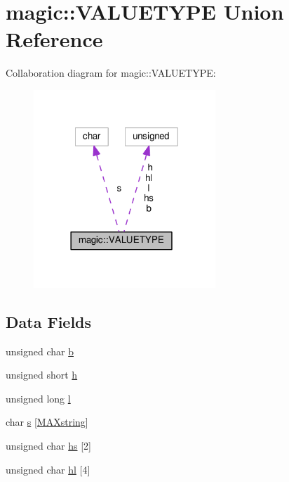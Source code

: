 \hypertarget{unionmagic_1_1VALUETYPE}{}\section{magic\+:\+:V\+A\+L\+U\+E\+T\+Y\+PE Union Reference}
\label{unionmagic_1_1VALUETYPE}


Collaboration diagram for magic\+:\+:V\+A\+L\+U\+E\+T\+Y\+PE\+:
\nopagebreak
\begin{figure}[H]
\begin{center}
\leavevmode
\includegraphics[width=194pt]{unionmagic_1_1VALUETYPE__coll__graph}
\end{center}
\end{figure}
\subsection*{Data Fields}
\begin{DoxyCompactItemize}
\item 
unsigned char \hyperlink{unionmagic_1_1VALUETYPE_a4378c4cc522bc5df8b7867a8d813cc6b}{b}
\item 
unsigned short \hyperlink{unionmagic_1_1VALUETYPE_a4502db7d2713403e30f98a61e5c29411}{h}
\item 
unsigned long \hyperlink{unionmagic_1_1VALUETYPE_a3adbff18dae0da97e74d7586f8c3662c}{l}
\item 
char \hyperlink{unionmagic_1_1VALUETYPE_a749edffc5d4364cb89939849f5b0dbac}{s} \mbox{[}\hyperlink{mod__mime__magic_8c_a182a3fb0ba7b39a649c4704d9e0c641e}{M\+A\+Xstring}\mbox{]}
\item 
unsigned char \hyperlink{unionmagic_1_1VALUETYPE_a6771337b6bfeeee90e4ed2bfcf40f34d}{hs} \mbox{[}2\mbox{]}
\item 
unsigned char \hyperlink{unionmagic_1_1VALUETYPE_adc526c7b8b43be8eff6bbd902b08d9ca}{hl} \mbox{[}4\mbox{]}
\end{DoxyCompactItemize}


